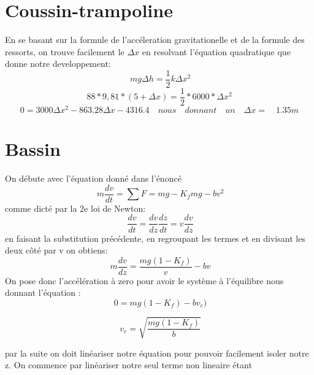 \documentclass{article}
\begin{document}
\section{Coussin-trampoline}
En se basant sur la formule de l'accéleration gravitationelle et de la formule des ressorts, on trouve facilement le $\Delta x$ en resolvant l'équation quadratique que donne notre developpement:
\begin{equation}
	\ mg \Delta h = \frac{1}{2}k \Delta x ^2
\end{equation}
\begin{equation}
	88*9,81*(5+\Delta x) = \frac{1}{2}*6000*\Delta x^2 
\end{equation}
\begin{equation}
	0 = 3000\Delta x^2 - 863.28 \Delta x - 4316.4 \quad nous\quad  donnant\quad  un\quad  		\Delta x=\quad 1.35m 
\end{equation}

\section{Bassin}
On débute avec l'équation donné dans l'énoncé
\begin{equation}
\ m \frac{dv}{dt} = \sum F = mg - K_{f}mg - bv^2
\end{equation}
comme dicté par la 2e loi de Newton:
\begin{equation}
\ \frac{dv}{dt} = \frac{dv}{dz} \frac{dz}{dt} = v\frac{dv}{dz}
\end{equation}
en faisant la substitution précédente, en regroupant les termes et en divisant les deux côté par v on obtiens:
\begin{equation}
\ m\frac{dv}{dz} =  \frac{mg ( 1- K_{f})}{v} - bv
\end{equation}
On pose donc l'accélération à zero pour avoir le système à l'équilibre nous donnant l'équation :
\begin{equation}
\ 0 =  mg ( 1- K_{f}) - bv_{e})
\end{equation}

\begin{equation}
\ v_{e} = \sqrt{\frac{mg(1-K_{f})}{b}}
\end{equation}

par la suite on doit linéariser notre équation pour pouvoir facilement isoler notre z. On commence par linéariser notre seul terme non lineaire étant 
\end{document}
